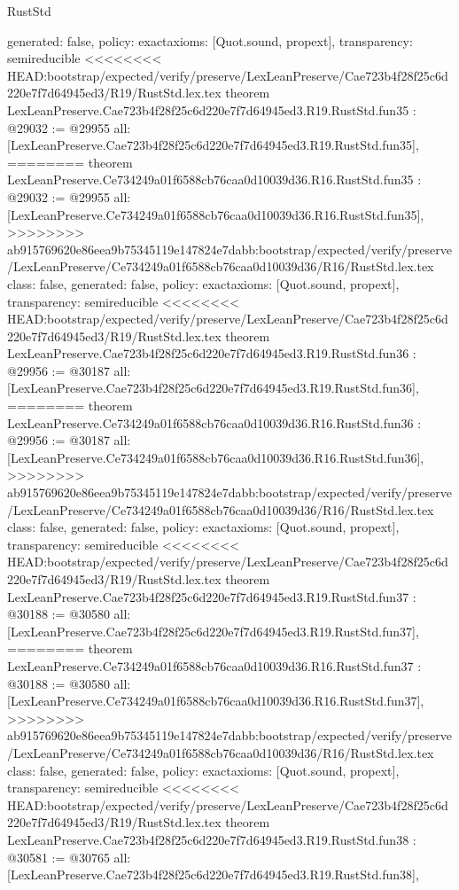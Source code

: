 \begin{lexlean}{RustStd}
\begin{coremodule}
{\begin{coremodule}
{{{{{{{{{{{{{{{{{{{{{{{{{{{{{{{{{{{{{{  generated: false,
  policy: exact{axioms: [Quot.sound, propext]},
  transparency: semireducible
}
<<<<<<<< HEAD:bootstrap/expected/verify/preserve/LexLeanPreserve/Cae723b4f28f25c6d220e7f7d64945ed3/R19/RustStd.lex.tex
theorem LexLeanPreserve.Cae723b4f28f25c6d220e7f7d64945ed3.R19.RustStd.fun35 : @29032 := @29955 {
  all: [LexLeanPreserve.Cae723b4f28f25c6d220e7f7d64945ed3.R19.RustStd.fun35],
========
theorem LexLeanPreserve.Ce734249a01f6588cb76caa0d10039d36.R16.RustStd.fun35 : @29032 := @29955 {
  all: [LexLeanPreserve.Ce734249a01f6588cb76caa0d10039d36.R16.RustStd.fun35],
>>>>>>>> ab915769620e86eea9b75345119e147824e7dabb:bootstrap/expected/verify/preserve/LexLeanPreserve/Ce734249a01f6588cb76caa0d10039d36/R16/RustStd.lex.tex
  class: false,
  generated: false,
  policy: exact{axioms: [Quot.sound, propext]},
  transparency: semireducible
}
<<<<<<<< HEAD:bootstrap/expected/verify/preserve/LexLeanPreserve/Cae723b4f28f25c6d220e7f7d64945ed3/R19/RustStd.lex.tex
theorem LexLeanPreserve.Cae723b4f28f25c6d220e7f7d64945ed3.R19.RustStd.fun36 : @29956 := @30187 {
  all: [LexLeanPreserve.Cae723b4f28f25c6d220e7f7d64945ed3.R19.RustStd.fun36],
========
theorem LexLeanPreserve.Ce734249a01f6588cb76caa0d10039d36.R16.RustStd.fun36 : @29956 := @30187 {
  all: [LexLeanPreserve.Ce734249a01f6588cb76caa0d10039d36.R16.RustStd.fun36],
>>>>>>>> ab915769620e86eea9b75345119e147824e7dabb:bootstrap/expected/verify/preserve/LexLeanPreserve/Ce734249a01f6588cb76caa0d10039d36/R16/RustStd.lex.tex
  class: false,
  generated: false,
  policy: exact{axioms: [Quot.sound, propext]},
  transparency: semireducible
}
<<<<<<<< HEAD:bootstrap/expected/verify/preserve/LexLeanPreserve/Cae723b4f28f25c6d220e7f7d64945ed3/R19/RustStd.lex.tex
theorem LexLeanPreserve.Cae723b4f28f25c6d220e7f7d64945ed3.R19.RustStd.fun37 : @30188 := @30580 {
  all: [LexLeanPreserve.Cae723b4f28f25c6d220e7f7d64945ed3.R19.RustStd.fun37],
========
theorem LexLeanPreserve.Ce734249a01f6588cb76caa0d10039d36.R16.RustStd.fun37 : @30188 := @30580 {
  all: [LexLeanPreserve.Ce734249a01f6588cb76caa0d10039d36.R16.RustStd.fun37],
>>>>>>>> ab915769620e86eea9b75345119e147824e7dabb:bootstrap/expected/verify/preserve/LexLeanPreserve/Ce734249a01f6588cb76caa0d10039d36/R16/RustStd.lex.tex
  class: false,
  generated: false,
  policy: exact{axioms: [Quot.sound, propext]},
  transparency: semireducible
}
<<<<<<<< HEAD:bootstrap/expected/verify/preserve/LexLeanPreserve/Cae723b4f28f25c6d220e7f7d64945ed3/R19/RustStd.lex.tex
theorem LexLeanPreserve.Cae723b4f28f25c6d220e7f7d64945ed3.R19.RustStd.fun38 : @30581 := @30765 {
  all: [LexLeanPreserve.Cae723b4f28f25c6d220e7f7d64945ed3.R19.RustStd.fun38],
}}}}}}}}}}}}}}}}}}}}}}}}}}}}}}}}}}}}}}}}}
\end{coremodule}}
\end{coremodule}
\end{lexlean}
